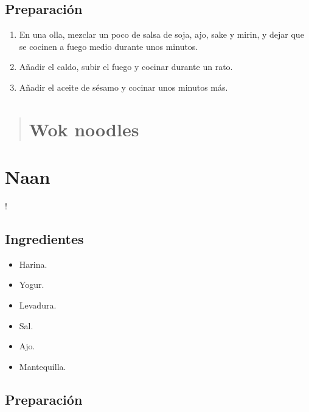 \documentclass[
]{book}
\providecommand{\tightlist}{%
  \setlength{\itemsep}{0pt}\setlength{\parskip}{0pt}}
\begin{document}
\hypertarget{preparaciuxf3n-8}{%
\section*{Preparación}\label{preparaciuxf3n-8}}

\begin{enumerate}
\def\labelenumi{\arabic{enumi}.}
\tightlist
\item
  En una olla, mezclar un poco de salsa de soja, ajo, sake y mirin, y dejar que se cocinen a fuego medio durante unos minutos.
\item
  Añadir el caldo, subir el fuego y cocinar durante un rato.
\item
  Añadir el aceite de sésamo y cocinar unos minutos más.
\end{enumerate}

\begin{quote}
\hypertarget{wok-noodles}{%
\chapter{Wok noodles}\label{wok-noodles}}
\end{quote}

\hypertarget{naan}{%
\chapter{Naan}\label{naan}}

!

\hypertarget{ingredientes-9}{%
\section*{Ingredientes}\label{ingredientes-9}}

\begin{itemize}
\tightlist
\item
  Harina.
\item
  Yogur.
\item
  Levadura.
\item
  Sal.
\item
  Ajo.
\item
  Mantequilla.
\end{itemize}

\hypertarget{preparaciuxf3n-9}{%
\section*{Preparación}\label{preparaciuxf3n-9}}
\end{document}
